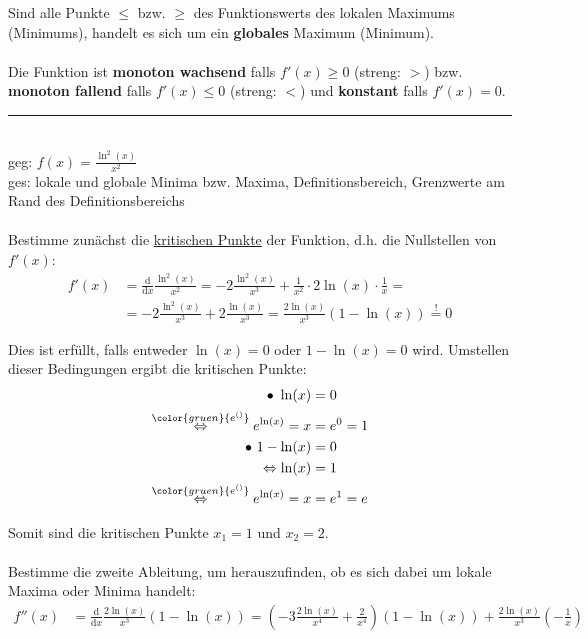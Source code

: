 \documentclass{article}
\newcommand{\diff}{\mathrm{d}}
\newcommand{\lr}[1]{\left(#1\right)}
\newcommand{\commentmath}[1]{{\color{gruen}{#1}}}
\begin{document}
Sind alle Punkte $\leq$ bzw. $\geq$ des Funktionswerts des lokalen Maximums (Minimums), handelt es sich um ein \textbf{globales} Maximum (Minimum).\\
\\
Die Funktion ist \textbf{monoton wachsend} falls $f'(x)\geq 0$ (streng: $>$) bzw. \textbf{monoton fallend} falls $f'(x)\leq 0$ (streng: $<$) und \textbf{konstant} falls $f'(x) = 0$.

\vspace{0.5cm}

{\color{blue}
\hrule
	\\
	geg: $f(x) = \frac{\ln^2(x)}{x^2}$\\
	ges: lokale und globale Minima bzw. Maxima, Definitionsbereich, Grenzwerte am Rand des Definitionsbereichs\\
	\\
	Bestimme zunächst die \underline{kritischen Punkte} der Funktion, d.h. die Nullstellen von $f'(x)$:
		\begin{align*}
			f'(x) &= \frac{\diff}{\diff x} \frac{\ln^2(x)}{x^2} = -2\frac{\ln^2(x)}{x^3} + \frac{1}{x^2} \cdot 2\ln(x) \cdot \frac{1}{x} = \\
			&= -2 \frac{\ln^2(x)}{x^3} + 2\frac{\ln(x)}{x^3} = \frac{2\ln(x)}{x^3}(1 - \ln(x)) \stackrel{!}{=} 0
		\end{align*}
	
	Dies ist erfüllt, falls entweder $\ln(x) = 0$ oder $1 - \ln(x) = 0$ wird. Umstellen dieser Bedingungen ergibt die kritischen Punkte:
		\begin{align*}
			\bullet \ \ln(x) &= 0 \\
			\stackrel{\commentmath{e^{()}}}{\Leftrightarrow} e^{\ln(x)} = x &= e^0 = 1 \\
			\bullet \ 1 - \ln(x) &= 0 \\
			\Leftrightarrow \ln(x) &= 1 \\
			\stackrel{ \commentmath{ e^{()} } }{\Leftrightarrow} e^{\ln(x)} = x &= e^1 = e
		\end{align*}
	
	Somit sind die kritischen Punkte $x_1 = 1$ und $x_2 = 2$.\\
	\\
	Bestimme die zweite Ableitung, um herauszufinden, ob es sich dabei um lokale Maxima oder Minima handelt:
		\begin{align*}
			f''(x) &= \frac{\diff}{\diff x} \frac{2\ln(x)}{x^3}(1 - \ln(x)) = \lr{ -3 \frac{2\ln(x)}{x^4} + \frac{2}{x^4} }\lr{1 - \ln(x)} + \frac{2\ln(x)}{x^3}\lr{ -\frac{1}{x} }			
		\end{align*}
	
}
\end{document}
